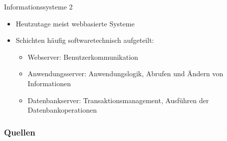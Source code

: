 \documentclass{beamer}
\begin{document}
			\begin{frame}{Informationssysteme 2}
			\begin{itemize}
				\item Heutzutage meist webbasierte Systeme
				\item Schichten häufig softwaretechnisch aufgeteilt:
				\begin{itemize}
					\item Webserver: Benutzerkommunikation
					\item Anwendungsserver: Anwendungslogik, Abrufen und Ändern von Informationen
					\item Datenbankserver: Transaktionsmanagement, Ausführen der Datenbankoperationen
				\end{itemize}
			\end{itemize}
			\end{frame}
	\begin{frame}[allowframebreaks]
		\frametitle{Quellen}
		\printbibliography[heading=none]
	\end{frame}
\end{document}
